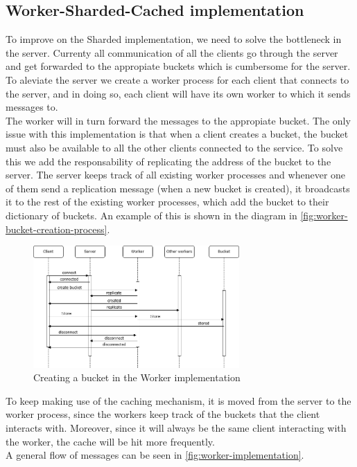 \documentclass{article}
\begin{document}
\subsection{Worker-Sharded-Cached implementation}
To improve on the Sharded implementation, we need to solve the bottleneck in the
server. Currenty all communication of all the clients go through the server and
get forwarded to the appropiate buckets which is cumbersome for the server. To
aleviate the server we create a worker process for each client that connects to
the server, and in doing so, each client will have its own worker to which it
sends messages to. \\
The worker will in turn forward the messages to the appropiate bucket. The only
issue with this implementation is that when a client creates a bucket, the
bucket must also be available to all the other clients connected to the service.
To solve this we add the responsability of replicating the address of the bucket
to the server. The server keeps track of all existing worker processes and
whenever one of them send a replication message (when a new bucket is created),
it broadcasts it to the rest of the existing worker processes, which add the
bucket to their dictionary of buckets. An example of this is shown in the
diagram in \autoref{fig:worker-bucket-creation-process}.\par
\begin{figure}[H]
	\centering
	\includegraphics[width=0.7\textwidth]{worker-bucket-creation-process.png}
	\caption{Creating a bucket in the Worker implementation}
	\label{fig:worker-bucket-creation-process}
\end{figure}
To keep making use of the caching mechanism, it is moved from the server to the
worker process, since the workers keep track of the buckets that the client
interacts with. Moreover, since it will always be the same client interacting
with the worker, the cache will be hit more frequently. \\
A general flow of messages can be seen in \autoref{fig:worker-implementation}.
\end{document}
